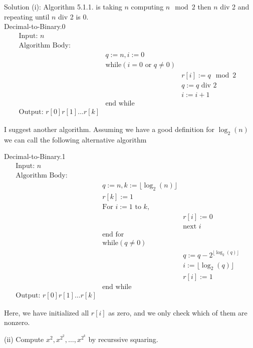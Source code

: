 \documentclass[16 pt]{amsart}
\theoremstyle{definition}
\theoremstyle{remark}
\numberwithin{equation}{subsection}
\begin{document}
Solution (i):
Algorithm 5.1.1. is taking $n$ computing $n \mod{2}$ then $n$ div 2 and repeating until $n$ div 2 is 0.\\



Decimal-to-Binary.0
\[
\begin{array}{llll}
\text{Input: } n &&&\\
\text{Algorithm Body:} &&&\\
& q:=n, i:= 0 &&\\
& \text{while} (i=0 \text{ or } q\neq 0) &&\\
&& r[i]:= q \mod{2} &\\
&& q := q \text{ div } 2 &\\
&& i := i+1 & \\
& \text{end while} &&\\
\text{Output: } r[0]r[1]\dots r[k]
\end{array}
\]



I suggest another algorithm.  Assuming we have a good definition for $\log_2(n)$ we can call the following alternative algorithm

Decimal-to-Binary.1
\[
\begin{array}{llll}
\text{Input: } n &&&\\
\text{Algorithm Body:} &&&\\
& q:=n, k:= \lfloor \log_2(n) \rfloor &&\\
& r[k]:=1 && \\
& \text{For } i:= 1 \text{ to }k, && \\
& & r[i]:=0 & \\
&& \text{next } i & \\
& \text{end for} &&\\
& \text{while} (q\neq 0) &&\\
&& q:= q - 2^{\lfloor \log_2(q)\rfloor} &\\
&& i := \lfloor \log_2(q)\rfloor &\\
&& r[i] := 1 & \\
& \text{end while} &&\\
\text{Output: } r[0]r[1]\dots r[k]
\end{array}
\]

Here, we have initialized all $r[i]$ as zero, and we only check which of them are nonzero.\\


\vspace{1in}

(ii) Compute $x^2, x^{2^2}, \dots, x^{2^k}$ by recurssive squaring.
\end{document}
